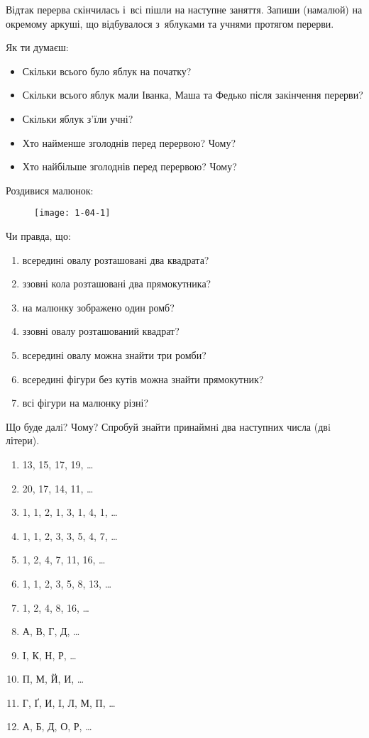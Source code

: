 Відтак перерва скінчилась і~всі пішли на наступне заняття.
Запиши (намалюй) на окремому аркуші, що відбувалося з~яблуками
та учнями протягом перерви.

Як ти думаєш:
\begin{itemize}
    \item Скільки всього було яблук на початку?
    \item Скільки всього яблук мали Іванка, Маша та Федько
    після закінчення перерви?
    \item Скільки яблук з'їли учні?
    \item Хто найменше зголоднів перед перервою? Чому?
    \item Хто найбільше зголоднів перед перервою? Чому?
\end{itemize}


\problem
Роздивися малюнок:

\begin{figure}[h]
    \centering
    \texttt{[image: 1-04-1]}
\end{figure}

Чи правда, що:
\begin{enumerate}
    \item всередині овалу розташовані два квадрата?
    \item ззовні кола розташовані два прямокутника?
    \item на малюнку зображено один ромб?
    \item ззовні овалу розташований квадрат?
    \item всередині овалу можна знайти три ромби?
    \item всередині фігури без кутів можна знайти прямокутник?
    \item всі фігури на малюнку різні?
\end{enumerate}



\problem
Що буде далi? Чому?
Спробуй знайти принаймнi два наступних числа (двi літери).
\begin{enumerate}
    \item 13, 15, 17, 19, \ldots
    \item 20, 17, 14, 11, \ldots
    \item 1, 1, 2, 1, 3, 1, 4, 1, \ldots
    \item 1, 1, 2, 3, 3, 5, 4, 7, \ldots
    \item 1, 2, 4, 7, 11, 16, \ldots
    \item 1, 1, 2, 3, 5, 8, 13, \ldots
    \item 1, 2, 4, 8, 16, \ldots
    \item А, В, Г, Д, \ldots
    \item I, К, Н, Р, \ldots
    \item П, М, Й, И, \ldots
    \item Г, Ґ, И, I, Л, М, П, \ldots
    \item А, Б, Д, О, Р, \ldots
\end{enumerate}


